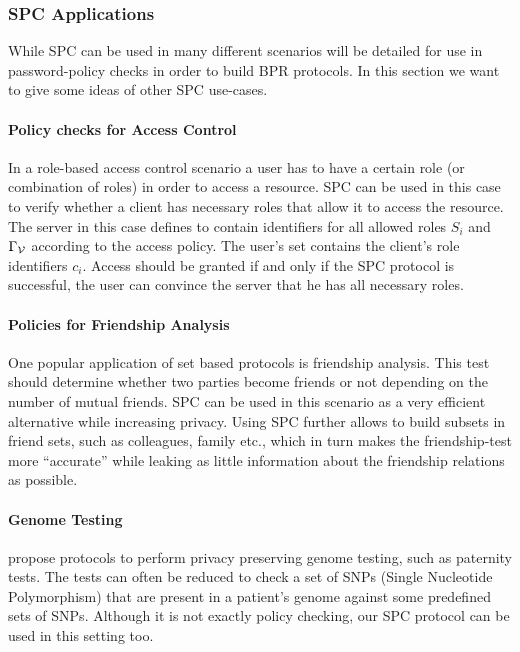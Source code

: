 \subsubsection{SPC Applications}\label{sec:generalisation}
While \ac{SPC} can be used in many different scenarios will be detailed for use in password-policy checks in order to build \ac{BPR} protocols.
In this section we want to give some ideas of other \ac{SPC} use-cases.

\paragraph{Policy checks for Access Control}
In a role-based access control scenario \cite{FerraioloK09} a user has to have a certain role (or combination of roles) in order to access a resource.
\ac{SPC} can be used in this case to verify whether a client has necessary roles that allow it to access the resource.
The server in this case defines \ServerSet to contain identifiers for all allowed roles $S_i$ and $\Gamma_\mathcal{V}$ according to the access policy.
The user's set \ClientSet contains the client's role identifiers $c_i$.
Access should be granted if and only if the \ac{SPC} protocol is successful, \ie the user can convince the server that he has all necessary roles.

\paragraph{Policies for Friendship Analysis}
One popular application of set based protocols is friendship analysis.
This test should determine whether two parties become friends or not depending on the number of mutual friends.
\ac{SPC} can be used in this scenario as a very efficient alternative while increasing privacy.
Using \ac{SPC} further allows to build subsets in friend sets, such as colleagues, family etc., which in turn makes the friendship-test more ``accurate'' while leaking as little information about the friendship relations as possible.

\paragraph{Genome Testing}
\citet{BaldiBCGT11} propose protocols to perform privacy preserving genome testing, such as paternity tests. 
The tests can often be reduced to check a set of SNPs (Single Nucleotide Polymorphism) that are present in a patient's genome against some predefined sets of SNPs. Although it is not exactly policy checking, our \ac{SPC} protocol can be used in this setting too. 


